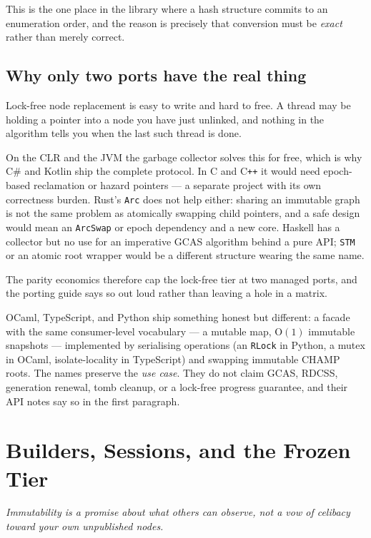 \documentclass[11pt,twoside,openright]{book}
\newcommand{\code}[1]{\texorpdfstring{\textcolor{d7ink}{\texttt{#1}}}{#1}}
\newcommand{\bigoh}[1]{$\mathrm{O}(#1)$}
\newcommand{\motto}[1]{%
  \begingroup
  \vspace{-4pt}\hfill\begin{minipage}{0.80\textwidth}
    \raggedleft\itshape\color{d7slate}\small #1\par
  \end{minipage}\par\vspace{18pt}
  \endgroup}
\begin{document}
This is the one place in the library where a hash structure commits to an
enumeration order, and the reason is precisely that conversion must be
\emph{exact} rather than merely correct.

\section{Why only two ports have the real thing}

\begin{caveatbox}
Lock-free node replacement is easy to write and hard to free. A thread may be
holding a pointer into a node you have just unlinked, and nothing in the
algorithm tells you when the last such thread is done.

On the CLR and the JVM the garbage collector solves this for free, which is why
C\# and Kotlin ship the complete protocol. In C and C\texttt{++} it would need
epoch-based reclamation or hazard pointers --- a separate project with its own
correctness burden. Rust's \code{Arc} does not help either: sharing an
immutable graph is not the same problem as atomically swapping child pointers,
and a safe design would mean an \code{ArcSwap} or epoch dependency and a new
core. Haskell has a collector but no use for an imperative GCAS algorithm behind
a pure API; \code{STM} or an atomic root wrapper would be a different structure
wearing the same name.

The parity economics therefore cap the lock-free tier at two managed ports, and
the porting guide says so out loud rather than leaving a hole in a matrix.
\end{caveatbox}

OCaml, TypeScript, and Python ship something honest but different: a facade with
the same consumer-level vocabulary --- a mutable map, \bigoh{1} immutable
snapshots --- implemented by serialising operations (an \code{RLock} in Python, a
mutex in OCaml, isolate-locality in TypeScript) and swapping immutable CHAMP
roots. The names preserve the \emph{use case}. They do not claim GCAS, RDCSS,
generation renewal, tomb cleanup, or a lock-free progress guarantee, and their
API notes say so in the first paragraph.

\chapter{Builders, Sessions, and the Frozen Tier}
\label{ch:lifecycle}

\motto{Immutability is a promise about what others can observe, not a vow of
celibacy toward your own unpublished nodes.}
\end{document}
